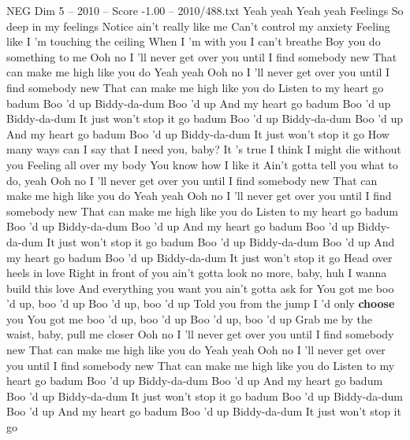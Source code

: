 \begin{textsample}{NEG Dim 5 – 2010 – Score -1.00 – 2010/488.txt}  \label{ex:f5_neg_016}
Yeah yeah Yeah yeah Feelings So deep in my feelings Notice ain't really like me Can't control my anxiety Feeling like I 'm touching the ceiling When I 'm with you I can't breathe Boy you do something to me Ooh no I 'll never get over you until I find somebody new That can make me high like you do Yeah yeah Ooh no I 'll never get over you until I find somebody new That can make me high like you do Listen to my heart go badum Boo 'd up Biddy-da-dum Boo 'd up And my heart go badum Boo 'd up Biddy-da-dum It just won't stop it go badum Boo 'd up Biddy-da-dum Boo 'd up And my heart go badum Boo 'd up Biddy-da-dum It just won't stop it go How many ways can I say that I need you, baby?
It 's true I think I might die without you Feeling all over my body You know how I like it Ain't gotta tell you what to do, yeah Ooh no I 'll never get over you until I find somebody new That can make me high like you do Yeah yeah Ooh no I 'll never get over you until I find somebody new That can make me high like you do Listen to my heart go badum Boo 'd up Biddy-da-dum Boo 'd up And my heart go badum Boo 'd up Biddy-da-dum It just won't stop it go badum Boo 'd up Biddy-da-dum Boo 'd up And my heart go badum Boo 'd up Biddy-da-dum It just won't stop it go Head over heels in love Right in front of you ain't gotta look no more, baby, huh I wanna build this love And everything you want you ain't gotta ask for You got me boo 'd up, boo 'd up Boo 'd up, boo 'd up Told you from the jump I 'd only \textbf{choose} you You got me boo 'd up, boo 'd up Boo 'd up, boo 'd up Grab me by the waist, baby, pull me closer Ooh no I 'll never get over you until I find somebody new That can make me high like you do Yeah yeah Ooh no I 'll never get over you until I find somebody new That can make me high like you do Listen to my heart go badum Boo 'd up Biddy-da-dum Boo 'd up And my heart go badum Boo 'd up Biddy-da-dum It just won't stop it go badum Boo 'd up Biddy-da-dum Boo 'd up And my heart go badum Boo 'd up Biddy-da-dum It just won't stop it go

\end{textsample}
